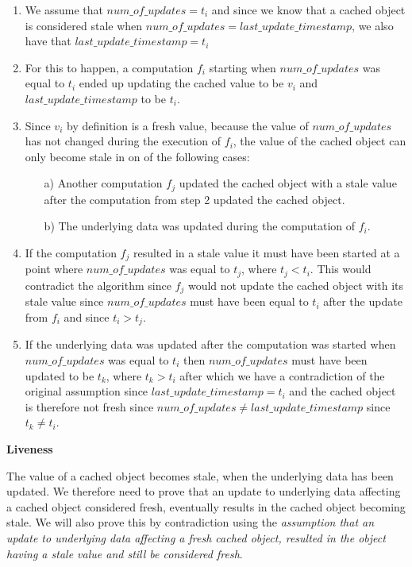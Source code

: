 \begin{enumerate}
  \item We assume that $num\_of\_updates = t_i$ and since we know that a cached object is considered stale when $num\_of\_updates = last\_update\_timestamp$, we also have that $last\_update\_timestamp = t_i$
  \item For this to happen, a computation $f_i$ starting when $num\_of\_updates$ was equal to $t_i$ ended up updating the cached value to be $v_i$ and $last\_update\_timestamp$ to be $t_i$.
  \item Since $v_i$ by definition is a fresh value, because the value of $num\_of\_updates$ has not changed during the execution of $f_i$, the value of the cached object can only become stale in on of the following cases:
    \begin{enumerate}
      \item[a)] Another computation $f_j$ updated the cached object with a stale value after the computation from step 2 updated the cached object.
      \item[b)] The underlying data was updated during the computation of $f_i$.
    \end{enumerate}
  \item If the computation $f_j$ resulted in a stale value it must have been started at a point where $num\_of\_updates$ was equal to $t_j$, where $t_j < t_i$. This would contradict the algorithm since $f_j$ would not update the cached object with its stale value since $num\_of\_updates$ must have been equal to $t_i$ after the update from $f_i$ and since $t_i > t_j$.
  \item If the underlying data was updated after the computation was started when $num\_of\_updates$ was equal to $t_i$ then $num\_of\_updates$ must have been updated to be $t_k$, where $t_k > t_i$ after which we have a contradiction of the original assumption since $last\_update\_timestamp = t_i$ and the cached object is therefore not fresh since $num\_of\_updates \neq last\_update\_timestamp$ since $t_k \neq t_i$.
\end{enumerate}

\textbf{Liveness}

The value of a cached object becomes stale, when the underlying data has been updated. We therefore need to prove that an update to underlying data affecting a cached object considered fresh, eventually results in the cached object becoming stale. We will also prove this by contradiction using the \emph{assumption that an update to underlying data affecting a fresh cached object, resulted in the object having a stale value and still be considered fresh}.

